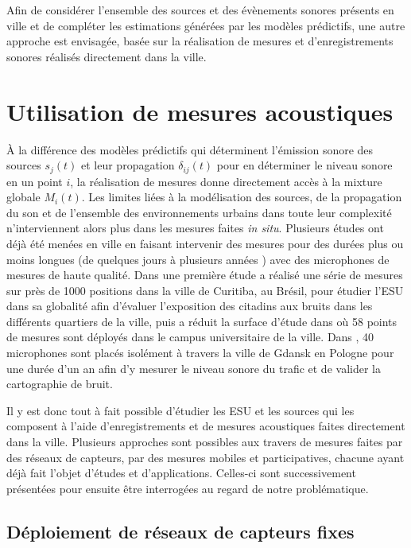 Afin de considérer l'ensemble des sources et des évènements sonores présents en ville et de compléter les estimations générées par les modèles prédictifs, une autre approche est envisagée, basée sur la réalisation de mesures et d'enregistrements sonores réalisés directement dans la ville.

\section{Utilisation de mesures acoustiques}

À la différence des modèles prédictifs qui déterminent l'émission sonore des sources $s_j(t)$ et leur propagation $\delta_{ij}(t)$ pour en déterminer le niveau sonore en un point $i$, la réalisation de mesures donne directement accès à la mixture globale $M_{i}(t)$. Les limites liées à la modélisation des sources, de la propagation du son et de l'ensemble des environnements urbains dans toute leur complexité n'interviennent alors plus dans les mesures faites \textit{in situ}.
Plusieurs études ont déjà été menées en ville en faisant intervenir des mesures pour des durées plus ou moins longues (de quelques jours \cite{romeu2011street} à plusieurs années \cite{gaja2003sampling}) avec des microphones de mesures de haute qualité. Dans une première étude \cite{zannin2002environmental} a réalisé une série de mesures sur près de 1000 positions dans la ville de Curitiba, au Brésil, pour étudier l'ESU dans sa globalité afin d'évaluer l'exposition des citadins aux bruits dans les différents quartiers de la ville, puis a réduit la surface d'étude dans \cite{zannin_characterization_2013} où 58 points de mesures sont déployés dans le campus universitaire de la ville.
Dans \cite{Mioduszewski}, 40 microphones sont placés isolément à travers la ville de Gdansk en Pologne pour une durée d'un an afin d'y mesurer le niveau sonore du trafic et de valider la cartographie de bruit.

Il y est donc tout à fait possible d'étudier les ESU et les sources qui les composent à l'aide d'enregistrements et de mesures acoustiques faites directement dans la ville. Plusieurs approches sont possibles aux travers de mesures faites par des réseaux de capteurs, par des mesures mobiles et participatives, chacune ayant déjà fait l'objet d'études et d'applications. Celles-ci sont successivement présentées pour ensuite être interrogées au regard de notre problématique.

\subsection{Déploiement de réseaux de capteurs fixes}

